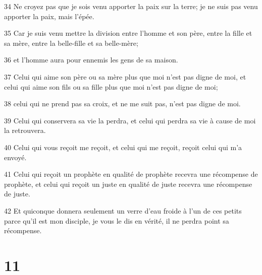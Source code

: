 \par 34 Ne croyez pas que je sois venu apporter la paix sur la terre; je ne suis pas venu apporter la paix, mais l'épée.
\par 35 Car je suis venu mettre la division entre l'homme et son père, entre la fille et sa mère, entre la belle-fille et sa belle-mère;
\par 36 et l'homme aura pour ennemis les gens de sa maison.
\par 37 Celui qui aime son père ou sa mère plus que moi n'est pas digne de moi, et celui qui aime son fils ou sa fille plus que moi n'est pas digne de moi;
\par 38 celui qui ne prend pas sa croix, et ne me suit pas, n'est pas digne de moi.
\par 39 Celui qui conservera sa vie la perdra, et celui qui perdra sa vie à cause de moi la retrouvera.
\par 40 Celui qui vous reçoit me reçoit, et celui qui me reçoit, reçoit celui qui m'a envoyé.
\par 41 Celui qui reçoit un prophète en qualité de prophète recevra une récompense de prophète, et celui qui reçoit un juste en qualité de juste recevra une récompense de juste.
\par 42 Et quiconque donnera seulement un verre d'eau froide à l'un de ces petits parce qu'il est mon disciple, je vous le dis en vérité, il ne perdra point sa récompense.

\chapter{11}

